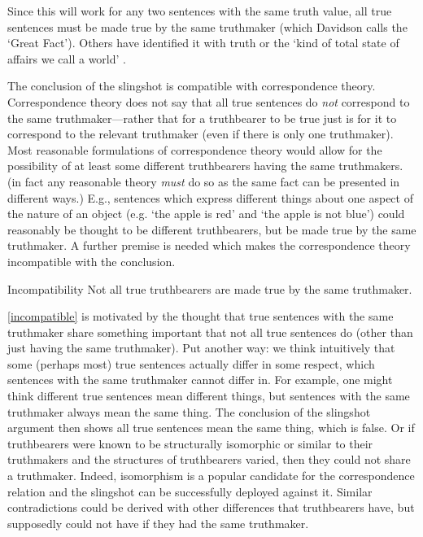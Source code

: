 Since this will work for any two sentences with the same truth value, all true sentences must be made true by the same truthmaker (which Davidson calls the `Great Fact').
\parencite[753]{Davidson_1969}
Others have identified it with truth \parencite[216]{Frege_1948} or the `kind of total state of affairs we call a world' \parencite[242]{TheModesOfMeLewis1943}.

The conclusion of the slingshot is compatible with correspondence theory.
Correspondence theory does not say that all true sentences do \emph{not} correspond to the same truthmaker---rather that for a truthbearer to be true just is for it to correspond to the relevant truthmaker (even if there is only one truthmaker).
Most reasonable formulations of correspondence theory would allow for the possibility of at least some different truthbearers having the same truthmakers.
(in fact any reasonable theory \emph{must} do so as the same fact can be presented in different ways.) %
E.g., sentences which express different things about one aspect of the nature of an object (e.g. `the apple is red' and `the apple is not blue')	could reasonably be thought to be different truthbearers, but be made true by the same truthmaker.
A further premise is needed which makes the correspondence theory incompatible with the conclusion.

	\begin{principle}{Incompatibility}\label{incompatible}
	Not all true truthbearers are made true by the same truthmaker.
	\end{principle}

\ref{incompatible} is motivated by the thought that true sentences with the same truthmaker share something important that not all true sentences do (other than just having the same truthmaker).
Put another way: we think intuitively that some (perhaps most) true sentences actually differ in some respect, which sentences with the same truthmaker cannot differ in.
For example, one might think different true sentences mean different things, but sentences with the same truthmaker always mean the same thing.
The conclusion of the slingshot argument then shows all true sentences mean the same thing, which is false.
Or if truthbearers were known to be structurally isomorphic or similar to their truthmakers and the structures of truthbearers varied, then they could not share a truthmaker.
Indeed, isomorphism is a popular candidate for the correspondence relation and the slingshot can be successfully deployed against it.
Similar contradictions could be derived with other differences that truthbearers have, but supposedly could not have if they had the same truthmaker.

